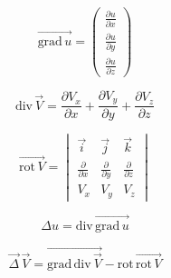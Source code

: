 
\[
	\overrightarrow{\text{grad}\, u} = 
	\begin{pmatrix}
		\frac{\partial u}{\partial x} \\
		\frac{\partial u}{\partial y} \\
		\frac{\partial u}{\partial z}
	\end{pmatrix}
\]





\[
	\text{div}\, \overrightarrow{V} = \frac{\partial V_x}{\partial x} + \frac{\partial V_y}{\partial y} + \frac{\partial V_z}{\partial z}
\]





\[
	\overrightarrow{\text{rot}\, V} = 
	\begin{vmatrix}
		\overrightarrow{i}          & \overrightarrow{j}          & \overrightarrow{k}          \\
		\frac{\partial}{\partial x} & \frac{\partial}{\partial y} & \frac{\partial}{\partial z} \\
		V_x                         & V_y                         & V_z
	\end{vmatrix}
\]





\[
	\Delta u = \text{div}\, \overrightarrow{\text{grad}\, u}
\]





\[
	\overrightarrow{\Delta}\, \overrightarrow{V} = \overrightarrow{\text{grad}\, \text{div}\, \overrightarrow{V}} - \text{rot}\, \overrightarrow{\text{rot}\, V}
\]

